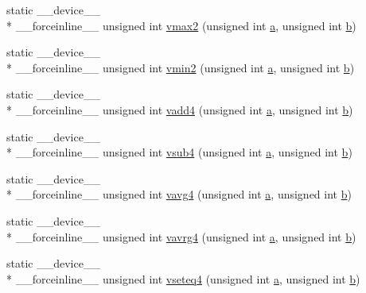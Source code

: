 \begin{DoxyCompactItemize}
\item 
static \-\_\-\-\_\-device\-\_\-\-\_\- \\*
\-\_\-\-\_\-forceinline\-\_\-\-\_\- unsigned int \hyperlink{namespacecv_1_1gpu_1_1device_ab7fc773837da55e6618c8d0747d936ce}{vmax2} (unsigned int \hyperlink{legacy_8hpp_a1031d0e0a97a340abfe0a6ab9e831045}{a}, unsigned int \hyperlink{legacy_8hpp_ac04272e8ca865b8fba18d36edae9fd2a}{b})
\item 
static \-\_\-\-\_\-device\-\_\-\-\_\- \\*
\-\_\-\-\_\-forceinline\-\_\-\-\_\- unsigned int \hyperlink{namespacecv_1_1gpu_1_1device_a810356d0c852a7cc42a7ae2400411cf8}{vmin2} (unsigned int \hyperlink{legacy_8hpp_a1031d0e0a97a340abfe0a6ab9e831045}{a}, unsigned int \hyperlink{legacy_8hpp_ac04272e8ca865b8fba18d36edae9fd2a}{b})
\item 
static \-\_\-\-\_\-device\-\_\-\-\_\- \\*
\-\_\-\-\_\-forceinline\-\_\-\-\_\- unsigned int \hyperlink{namespacecv_1_1gpu_1_1device_a8fc4fecf9494f9b5bb58b4a3ea445d92}{vadd4} (unsigned int \hyperlink{legacy_8hpp_a1031d0e0a97a340abfe0a6ab9e831045}{a}, unsigned int \hyperlink{legacy_8hpp_ac04272e8ca865b8fba18d36edae9fd2a}{b})
\item 
static \-\_\-\-\_\-device\-\_\-\-\_\- \\*
\-\_\-\-\_\-forceinline\-\_\-\-\_\- unsigned int \hyperlink{namespacecv_1_1gpu_1_1device_acfe3faa2d20842573210a4a8567c194a}{vsub4} (unsigned int \hyperlink{legacy_8hpp_a1031d0e0a97a340abfe0a6ab9e831045}{a}, unsigned int \hyperlink{legacy_8hpp_ac04272e8ca865b8fba18d36edae9fd2a}{b})
\item 
static \-\_\-\-\_\-device\-\_\-\-\_\- \\*
\-\_\-\-\_\-forceinline\-\_\-\-\_\- unsigned int \hyperlink{namespacecv_1_1gpu_1_1device_a217b9ca7d19e499379bead5173d0a8d6}{vavg4} (unsigned int \hyperlink{legacy_8hpp_a1031d0e0a97a340abfe0a6ab9e831045}{a}, unsigned int \hyperlink{legacy_8hpp_ac04272e8ca865b8fba18d36edae9fd2a}{b})
\item 
static \-\_\-\-\_\-device\-\_\-\-\_\- \\*
\-\_\-\-\_\-forceinline\-\_\-\-\_\- unsigned int \hyperlink{namespacecv_1_1gpu_1_1device_a04e7cccaf2961c143c082b04092f5a83}{vavrg4} (unsigned int \hyperlink{legacy_8hpp_a1031d0e0a97a340abfe0a6ab9e831045}{a}, unsigned int \hyperlink{legacy_8hpp_ac04272e8ca865b8fba18d36edae9fd2a}{b})
\item 
static \-\_\-\-\_\-device\-\_\-\-\_\- \\*
\-\_\-\-\_\-forceinline\-\_\-\-\_\- unsigned int \hyperlink{namespacecv_1_1gpu_1_1device_a7cdce4c102bee779a2253debba77d7db}{vseteq4} (unsigned int \hyperlink{legacy_8hpp_a1031d0e0a97a340abfe0a6ab9e831045}{a}, unsigned int \hyperlink{legacy_8hpp_ac04272e8ca865b8fba18d36edae9fd2a}{b})

\end{DoxyCompactItemize}
